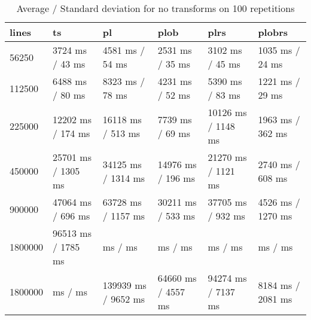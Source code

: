\begin{table}[ht]
	\caption{Average / Standard deviation for no transforms on 100 repetitions}
	\label{tab:eval:none}
	\begin{tabular}{|l|l|l|l|l|l|}
		\hline
		lines   & ts                 & pl                  & plob               & plrs               & plobrs            \\
		\hline
		56250   & 3724 ms / 43 ms    & 4581 ms / 54 ms     & 2531 ms / 35 ms    & 3102 ms / 45 ms    & 1035 ms / 24 ms   \\
		112500  & 6488 ms / 80 ms    & 8323 ms / 78 ms     & 4231 ms / 52 ms    & 5390 ms / 83 ms    & 1221 ms / 29 ms   \\
		225000  & 12202 ms / 174 ms  & 16118 ms / 513 ms   & 7739 ms / 69 ms    & 10126 ms / 1148 ms & 1963 ms / 362 ms  \\
		450000  & 25701 ms / 1305 ms & 34125 ms / 1314 ms  & 14976 ms / 196 ms  & 21270 ms / 1121 ms & 2740 ms / 608 ms  \\
		900000  & 47064 ms / 696 ms  & 63728 ms / 1157 ms  & 30211 ms / 533 ms  & 37705 ms / 932 ms  & 4526 ms / 1270 ms \\
		1800000 & 96513 ms / 1785 ms & ms /  ms            & ms / ms            & ms / ms            & ms / ms           \\
		\hline
		1800000 & ms /  ms           & 139939 ms / 9652 ms & 64660 ms / 4557 ms & 94274 ms / 7137 ms & 8184 ms / 2081 ms \\
		\hline
	\end{tabular}
\end{table}








\pagebreak
